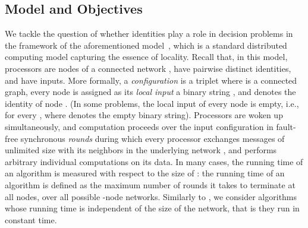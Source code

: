 \documentclass{llncs}
\begin{document}
\subsection{Model and Objectives}

We tackle the question of whether identities play a role in decision problems in the framework of the aforementioned  model~\cite{PelB00}, which is a standard distributed computing model capturing the essence of locality. Recall that, in this model, processors are nodes of a connected network , have pairwise distinct identities, and have inputs. More formally, a {\em configuration} is a triplet  where  is a connected graph, every node  is assigned as its {\em local input} a binary string , and  denotes the identity of node . (In some problems, the local input of every node is empty, i.e.,  for every , where  denotes the empty binary string). Processors are woken up simultaneously, and computation proceeds over the input configuration  in fault-free synchronous \emph{rounds} during which every processor exchanges messages of unlimited size with its neighbors in the underlying network , and performs arbitrary individual computations on its data. In many cases, the running time of an algorithm is measured with respect to the size  of : the running time of an algorithm is defined as the maximum number of rounds it takes to terminate at all nodes, over all possible -node networks. Similarly to \cite{HHRS12,NS93}, we consider algorithms whose running time is independent of the size of the network, that is they run in constant time. 
\end{document}
